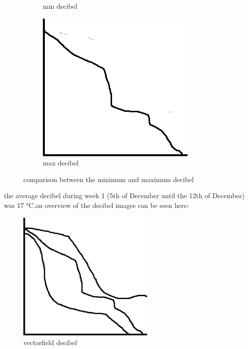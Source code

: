 \begin{figure}[hbt!]
\begin{subfigure}{0.3\textwidth}
\caption{min decibel}  
\end{subfigure} 
\begin{subfigure}{0.3\textwidth} 
\includegraphics[width=0.9\linewidth]{reports/current_report/images/average_graph_decibel.png}  
\caption{max decibel}  
\end{subfigure} 
\caption{comparison between the minimum and maximum decibel}  
\end{figure} 
\FloatBarrier  
the average decibel during week 1 (5th of December until the 12th of December) was 17 °C.an overview of the decibel images can be seen here:\begin{figure}
\includegraphics[width=0.6\textwidth]{reports/current_report/images/combined_graph_decibel.png}  
\caption{vectorfield decibel}  
\end{figure} 
\FloatBarrier  
